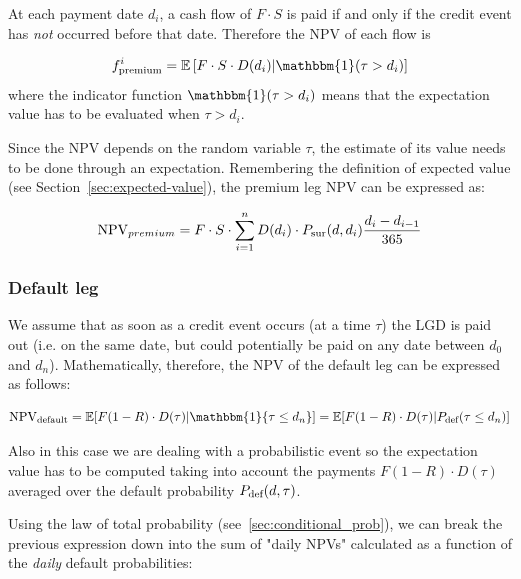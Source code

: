 At each payment date $d_i$, a cash flow of $F\cdot S$ is paid if and only if the credit event has \emph{not} occurred before that date. Therefore the NPV of each flow is

\begin{equation}
f_{\textrm{premium}}^i = \mathbb{E}\left[F\cdot S\cdot D(d_i)|\mathbbm{1}(\tau > d_i) \right]
\end{equation}
where the indicator function $\mathbbm{1}(\tau > d_i)$ means that the expectation value has to be evaluated when $\tau > d_i$. 

Since the NPV depends on the random variable $\tau$, the estimate of its value needs to be done through an expectation.
Remembering the definition of expected value (see Section~\ref{sec:expected-value}), %
the premium leg NPV can be expressed as:

\begin{equation}
\textrm{NPV}_{premium} = F\cdot S \cdot \sum_{i=1}^{n} D(d_i) \cdot P_{\text{sur}}(d, d_i)\frac{d_i-d_{i-1}}{365}
\end{equation}

\subsubsection{Default leg}
\label{default-leg}

We assume that as soon as a credit event occurs (at a time $\tau$) the LGD is paid out (i.e. on the same date, but could potentially be paid on any date between $d_0$ and $d_n$). Mathematically, therefore, the NPV of the default leg can be expressed as follows:

\begin{equation}
\mathrm{NPV_{default}} =\mathbb{E}[F(1-R)\cdot D(\tau)|\mathbbm{1} \{\tau \leq d_n\} ] = \mathbb{E}[F(1-R)\cdot D(\tau)|\Pdef(\tau \leq d_n) ]
\end{equation}

Also in this case we are dealing with a probabilistic event so the expectation value has to be computed taking into account the payments $F(1-R)\cdot D(\tau)$ averaged over the default probability $P_{\text{def}}(d, \tau)$. 

Using the law of total probability (see~\ref{sec:conditional_prob}), we can break the previous expression down into the sum of "daily NPVs" calculated as a function of the \emph{daily} default probabilities:

